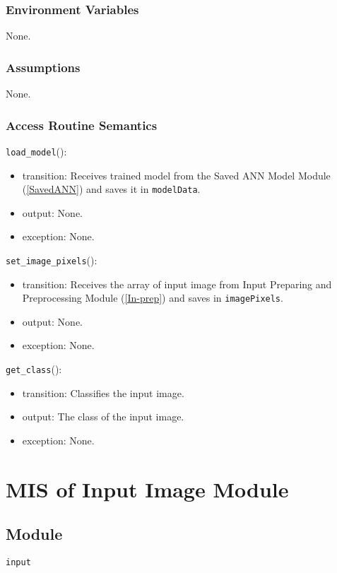 \documentclass[12pt, titlepage]{article}
\def\code#1{\texttt{#1}}
\begin{document}
\subsubsection{Environment Variables}
None.

\subsubsection{Assumptions}
None.

\subsubsection{Access Routine Semantics}

\noindent \code{load\_model}():
\begin{itemize}
  \item transition: Receives trained model from the Saved ANN Model Module (\ref{SavedANN}) 
  and saves it in \code{modelData}.
  \item output: None.
  \item exception: None.
\end{itemize}

\noindent \code{set\_image\_pixels}():
\begin{itemize}
  \item transition: Receives the array of input image from Input Preparing and Preprocessing Module (\ref{In-prep}) 
  and saves in \code{imagePixels}.
  \item output: None.
  \item exception: None.
\end{itemize}

\noindent \code{get\_class}():
\begin{itemize}
  \item transition: Classifies the input image.
  \item output: The class of the input image.
  \item exception: None.
\end{itemize}

\newpage

\section{MIS of Input Image Module} \label{In-set} 

\subsection{Module}
\code{input} 
\end{document}

